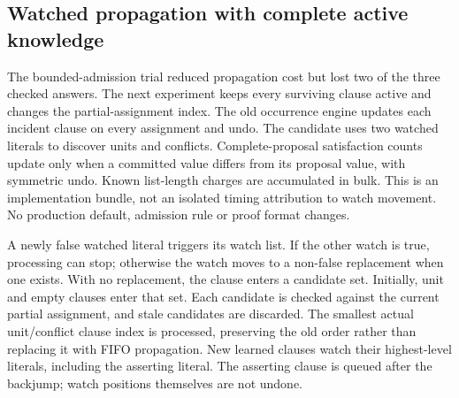 \subsection{Watched propagation with complete active knowledge}
\label{sec:watched-learning}

The bounded-admission trial reduced propagation cost but lost two of the three
checked answers.  The next experiment keeps every surviving clause active and
changes the partial-assignment index.  The old occurrence engine updates each
incident clause on every assignment and undo.  The candidate uses two watched
literals to discover units and conflicts.  Complete-proposal satisfaction counts
update only when a committed value differs from its proposal value, with
symmetric undo.  Known list-length charges are accumulated in bulk.  This is an
implementation bundle, not an isolated timing attribution to watch movement.
No production default, admission rule or proof format changes.

A newly false watched literal triggers its watch list.  If the other watch is
true, processing can stop; otherwise the watch moves to a non-false replacement
when one exists.  With no replacement, the clause enters a candidate set.
Initially, unit and empty clauses enter that set.  Each candidate is checked
against the current partial assignment, and stale candidates are discarded.
The smallest actual unit/conflict clause index is processed, preserving the old
order rather than replacing it with FIFO propagation.  New learned clauses watch
their highest-level literals, including the asserting literal.  The asserting
clause is queued after the backjump; watch positions themselves are not undone.

